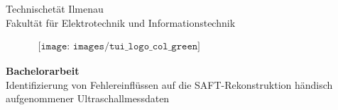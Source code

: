 \thispagestyle{empty}
\begin{center}
\large{Technischetät Ilmenau}\\
\large{Fakultät für Elektrotechnik und Informationstechnik}
\end{center}

\vspace{0.15cm}


\begin{figure}[htbp]
\begin{center}$
\begin{array}{cc}
\texttt{[image: images/tui\_logo\_col\_green]}
\end{array}$
\end{center}
\end{figure}

\vspace{0.6cm}

\begin{center}
\textbf{\Huge{Bachelorarbeit}}\\ \vspace{0.25cm}
\LARGE Identifizierung von Fehlereinflüssen auf die SAFT-Rekonstruktion händisch aufgenommener Ultraschallmessdaten
\end{center}
\vspace{.3cm}

\begin{center}
\Large

\end{center}


\vfill

